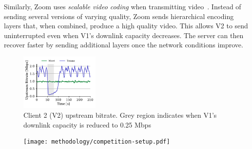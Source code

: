 Similarly, Zoom uses \textit{scalable video coding} when transmitting
video~\cite{zoom_encoding}. Instead of sending several versions of varying
quality, Zoom sends hierarchical encoding layers that, when combined,
produce a high quality video. This allows V2 to send uninterrupted
even when V1's downlink capacity decreases. The server can then recover faster
by sending additional layers once the network conditions improve.  

\begin{figure}[t]
    \centering
    \includegraphics[width=0.35\textwidth,keepaspectratio]{../figures/interrupt/Interrupt-sender.pdf}
    \caption{Client 2 (V2) upstream bitrate. Grey region indicates when V1's downlink capacity is reduced to 0.25 Mbps}
    \label{fig:interrupt-sender}
\end{figure}

\begin{figure}[]
   \centering
    \texttt{[image: methodology/competition-setup.pdf]}
    \caption{}
    \label{fig:competition-setup}
\end{figure}


